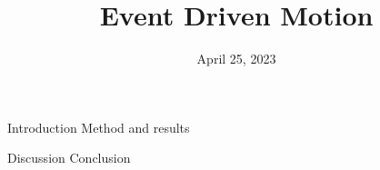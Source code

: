 \documentclass{article}
\begin{document}
\title{Event Driven Motion}
\date{April 25, 2023}
\maketitle

\begin{multicols}{2}

{Introduction}
{Method and results}

{Discussion}
{Conclusion}




\end{multicols}
\end{document}
